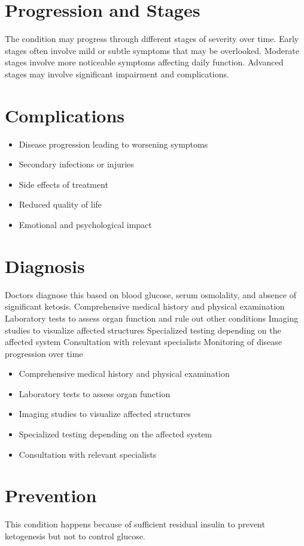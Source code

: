 \section{Progression and Stages}
The condition may progress through different stages of severity over time. Early stages often involve mild or subtle symptoms that may be overlooked. Moderate stages involve more noticeable symptoms affecting daily function. Advanced stages may involve significant impairment and complications.
\section{Complications}
\begin{itemize}[noitemsep]
  \item Disease progression leading to worsening symptoms
  \item Secondary infections or injuries
  \item Side effects of treatment
  \item Reduced quality of life
  \item Emotional and psychological impact
\end{itemize}
\section{Diagnosis}
Doctors diagnose this based on blood glucose, serum osmolality, and absence of significant ketosis. Comprehensive medical history and physical examination Laboratory tests to assess organ function and rule out other conditions Imaging studies to visualize affected structures Specialized testing depending on the affected system Consultation with relevant specialists Monitoring of disease progression over time

\begin{itemize}[noitemsep]
  \item Comprehensive medical history and physical examination
  \item Laboratory tests to assess organ function
  \item Imaging studies to visualize affected structures
  \item Specialized testing depending on the affected system
  \item Consultation with relevant specialists
\end{itemize}
\section{Prevention}
This condition happens because of sufficient residual insulin to prevent ketogenesis but not to control glucose.

